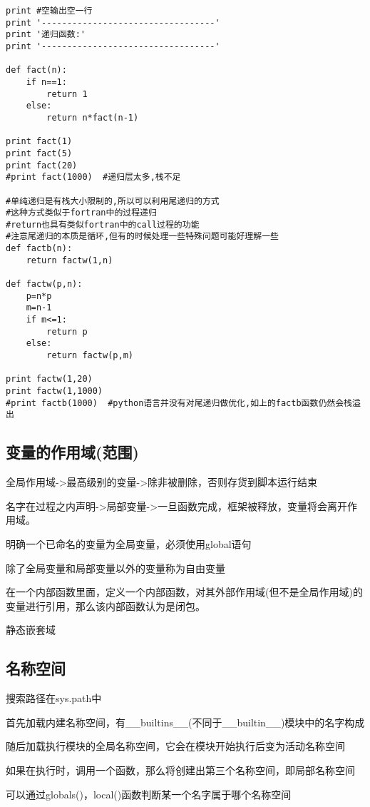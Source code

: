 \documentclass[twoside,11pt]{book}
\begin{document}
\begin{lstlisting}
print #空输出空一行
print '----------------------------------'
print '递归函数:'
print '----------------------------------'

def fact(n):
    if n==1:
        return 1
    else:
        return n*fact(n-1)

print fact(1)
print fact(5)
print fact(20)
#print fact(1000)  #递归层太多,栈不足

#单纯递归是有栈大小限制的,所以可以利用尾递归的方式
#这种方式类似于fortran中的过程递归
#return也具有类似fortran中的call过程的功能
#注意尾递归的本质是循环,但有的时候处理一些特殊问题可能好理解一些
def factb(n):
    return factw(1,n)

def factw(p,n):
    p=n*p
    m=n-1
    if m<=1:
        return p
    else:
        return factw(p,m)

print factw(1,20)
print factw(1,1000)
#print factb(1000)  #python语言并没有对尾递归做优化,如上的factb函数仍然会栈溢出
\end{lstlisting}


\subsection{变量的作用域(范围)}

全局作用域->最高级别的变量->除非被删除，否则存货到脚本运行结束

名字在过程之内声明->局部变量->一旦函数完成，框架被释放，变量将会离开作用域。

明确一个已命名的变量为全局变量，必须使用global语句

除了全局变量和局部变量以外的变量称为自由变量

在一个内部函数里面，定义一个内部函数，对其外部作用域(但不是全局作用域)的变量进行引用，那么该内部函数认为是闭包。


静态嵌套域




\subsection{名称空间}
搜索路径在sys.path中

首先加载内建名称空间，有\_\_builtins\_\_(不同于\_\_builtin\_\_)模块中的名字构成

随后加载执行模块的全局名称空间，它会在模块开始执行后变为活动名称空间

如果在执行时，调用一个函数，那么将创建出第三个名称空间，即局部名称空间

可以通过globals()，local()函数判断某一个名字属于哪个名称空间
\end{document}
